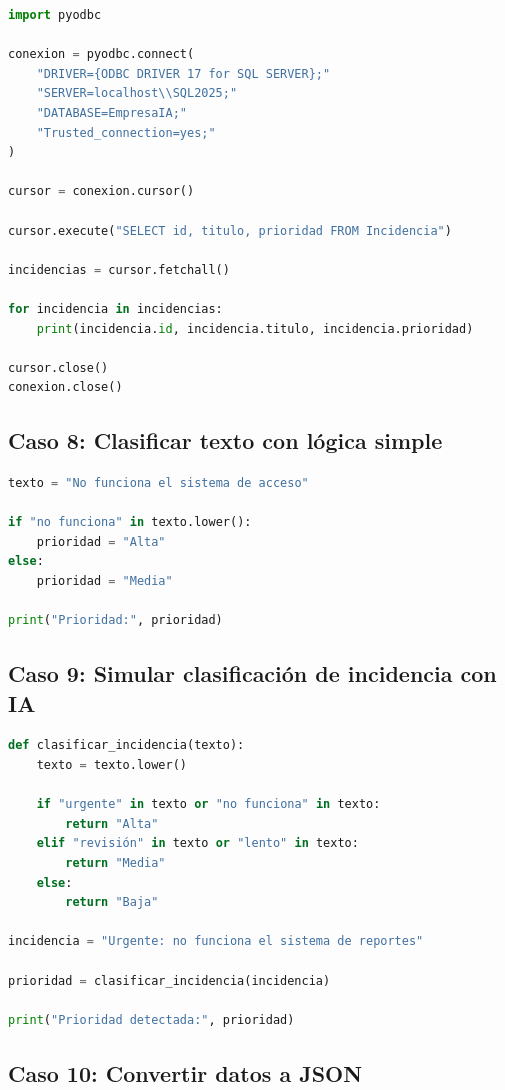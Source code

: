 \documentclass[12pt]{article}
\begin{document}
\begin{lstlisting}[language=Python]
import pyodbc

conexion = pyodbc.connect(
    "DRIVER={ODBC DRIVER 17 for SQL SERVER};"
    "SERVER=localhost\\SQL2025;"
    "DATABASE=EmpresaIA;"
    "Trusted_connection=yes;"
)

cursor = conexion.cursor()

cursor.execute("SELECT id, titulo, prioridad FROM Incidencia")

incidencias = cursor.fetchall()

for incidencia in incidencias:
    print(incidencia.id, incidencia.titulo, incidencia.prioridad)

cursor.close()
conexion.close()
\end{lstlisting}

\subsection{Caso 8: Clasificar texto con lógica simple}

\begin{lstlisting}[language=Python]
texto = "No funciona el sistema de acceso"

if "no funciona" in texto.lower():
    prioridad = "Alta"
else:
    prioridad = "Media"

print("Prioridad:", prioridad)
\end{lstlisting}

\subsection{Caso 9: Simular clasificación de incidencia con IA}

\begin{lstlisting}[language=Python]
def clasificar_incidencia(texto):
    texto = texto.lower()

    if "urgente" in texto or "no funciona" in texto:
        return "Alta"
    elif "revisión" in texto or "lento" in texto:
        return "Media"
    else:
        return "Baja"

incidencia = "Urgente: no funciona el sistema de reportes"

prioridad = clasificar_incidencia(incidencia)

print("Prioridad detectada:", prioridad)
\end{lstlisting}

\subsection{Caso 10: Convertir datos a JSON}
\end{document}
